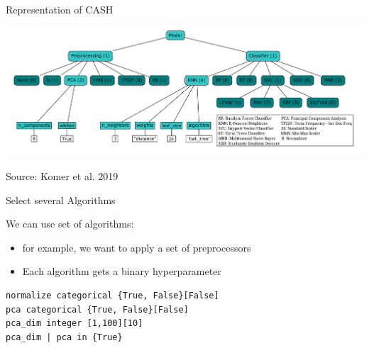 \begin{frame}[c, fragile]{Representation of CASH}

\centering
\includegraphics[width=1.0\textwidth]{images/cash}

\hfill Source: Komer et al. 2019

\end{frame}

\begin{frame}[c, fragile]{Select several Algorithms}

We can use set of algorithms:
\begin{itemize}
  \item for example, we want to apply a set of preprocessors
  \item Each algorithm gets a binary hyperparameter
\end{itemize}

\begin{verbatim}
normalize categorical {True, False}[False]
pca categorical {True, False}[False]
pca_dim integer [1,100][10]
pca_dim | pca in {True}
\end{verbatim}

\end{frame}
